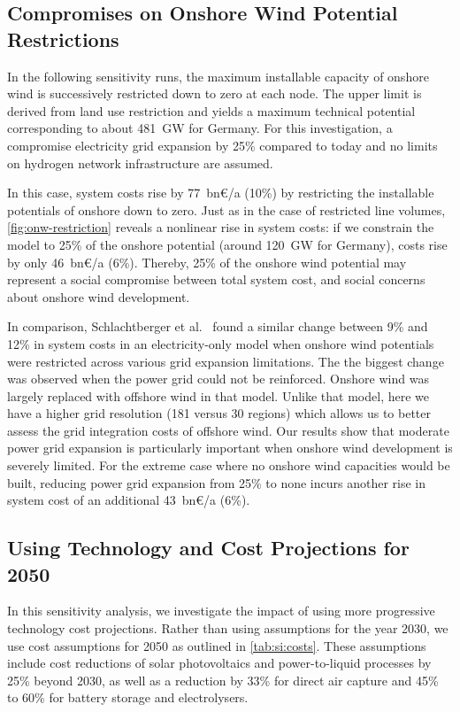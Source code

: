 \subsection{Compromises on Onshore Wind Potential Restrictions}
\label{sec:si:onw-compromise}

In the following sensitivity runs, the maximum installable capacity of onshore
wind is successively restricted down to zero at each node. The upper limit is
derived from land use restriction and yields a maximum technical potential
corresponding to about \SI{481}{\giga\watt} for Germany. For this investigation,
a compromise electricity grid expansion by 25\% compared to today and no limits
on hydrogen network infrastructure are assumed.

In this case, system costs rise by 77~bn\euro/a (10\%)
by restricting the installable potentials of onshore down to zero. Just as in
the case of restricted line volumes, \cref{fig:onw-restriction} reveals a
nonlinear rise in system costs: if we constrain the model to 25\% of the onshore
potential (around 120~GW for Germany), costs rise by only 46~bn\euro/a (6\%).
Thereby, 25\% of the onshore wind potential may represent a social compromise
between total system cost, and social concerns about onshore wind development.

In comparison, Schlachtberger et al.~ found
a similar change between 9\% and 12\% in system costs in an electricity-only
model when onshore wind potentials were restricted across various grid expansion
limitations. The the biggest change was observed when the power grid could not
be reinforced. Onshore wind was largely replaced with offshore wind in that
model. Unlike that model, here we have a higher grid resolution (181 versus 30
regions) which allows us to better assess the grid integration costs of offshore
wind. Our results show that moderate power grid expansion is particularly
important when onshore wind development is severely limited. For the extreme
case where no onshore wind capacities would be built, reducing power grid
expansion from 25\% to none incurs another rise in system cost of an additional
43~bn\euro/a (6\%).

\subsection{Using Technology and Cost Projections for 2050}
\label{sec:si:sensitivity-costs}

In this sensitivity analysis, we investigate the impact of using more
progressive technology cost projections.
Rather than using assumptions for the year 2030, we use cost assumptions for
2050 as outlined in \cref{tab:si:costs}. These assumptions include cost
reductions of solar photovoltaics and power-to-liquid processes by 25\% beyond
2030, as well as a reduction by 33\% for direct air capture and 45\% to 60\% for
battery storage and electrolysers.

